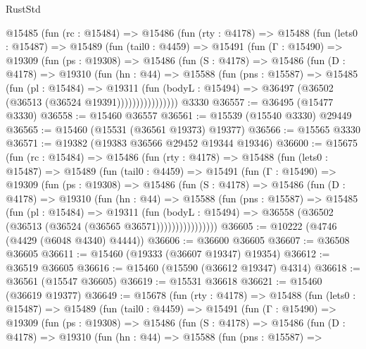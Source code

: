 \begin{lexlean}{RustStd}
\begin{coremodule}
    @15485
      (fun (rc : @15484) =>
      @15486
        (fun (rty : @4178) =>
        @15488
          (fun (lets0 : @15487) =>
          @15489
            (fun (tail0 : @4459) =>
            @15491
              (fun (Γ : @15490) =>
              @19309
                (fun (ps : @19308) =>
                @15486
                  (fun (S : @4178) =>
                  @15486
                    (fun (D : @4178) =>
                    @19310
                      (fun (hn : @44) =>
                      @15588
                        (fun (pns : @15587) =>
                        @15485
                          (fun (pl : @15484) =>
                          @19311
                            (fun (bodyL : @15494) =>
                            @36497 (@36502 (@36513 (@36524 @19391))))))))))))))))
    @3330
@36557 := @36495 (@15477 @3330)
@36558 := @15460 @36557
@36561 := @15539 (@15540 @3330) @29449
@36565 := @15460 (@15531 (@36561 @19373) @19377)
@36566 := @15565 @3330
@36571 := @19382 (@19383 @36566 @29452 @19344 @19346)
@36600 := @15675
    (fun (rc : @15484) =>
    @15486
      (fun (rty : @4178) =>
      @15488
        (fun (lets0 : @15487) =>
        @15489
          (fun (tail0 : @4459) =>
          @15491
            (fun (Γ : @15490) =>
            @19309
              (fun (ps : @19308) =>
              @15486
                (fun (S : @4178) =>
                @15486
                  (fun (D : @4178) =>
                  @19310
                    (fun (hn : @44) =>
                    @15588
                      (fun (pns : @15587) =>
                      @15485
                        (fun (pl : @15484) =>
                        @19311
                          (fun (bodyL : @15494) =>
                          @36558 (@36502 (@36513 (@36524 (@36565 @36571))))))))))))))))
@36605 := @10222 (@4746 (@4429 (@6048 @4340) @4444))
@36606 := @36600 @36605
@36607 := @36508 @36605
@36611 := @15460 (@19333 (@36607 @19347) @19354)
@36612 := @36519 @36605
@36616 := @15460 (@15590 (@36612 @19347) @4314)
@36618 := @36561 (@15547 @36605)
@36619 := @15531 @36618
@36621 := @15460 (@36619 @19377)
@36649 := @15678
    (fun (rty : @4178) =>
    @15488
      (fun (lets0 : @15487) =>
      @15489
        (fun (tail0 : @4459) =>
        @15491
          (fun (Γ : @15490) =>
          @19309
            (fun (ps : @19308) =>
            @15486
              (fun (S : @4178) =>
              @15486
                (fun (D : @4178) =>
                @19310
                  (fun (hn : @44) =>
                  @15588
                    (fun (pns : @15587) =>

\end{coremodule}
\end{lexlean}

